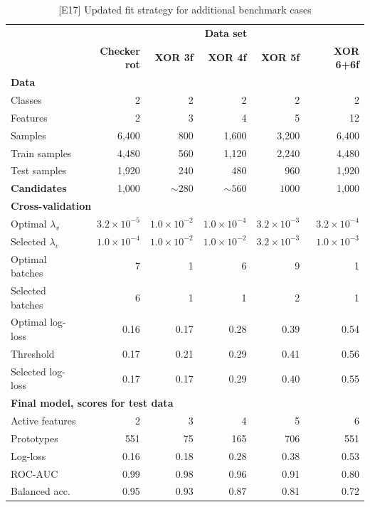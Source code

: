 \begin{table}
\caption{[E17] Updated fit strategy for additional benchmark cases}
\label{tab_e17}
%
\begin{center}
\small
\begin{tabular}{|lrrrrr|}
\hline
&\multicolumn{5}{c|}{\textbf{\hrulefill\ Data set \hrulefill}}\\
&\textbf{Checker rot}&\textbf{XOR 3f}&\textbf{XOR 4f}&\textbf{XOR 5f}&\textbf{XOR 6+6f}\\
\multicolumn{6}{|l|}{\textbf{Data}}\\
Classes&2&2&2&2&2\\
Features&2&3&4&5&12\\
Samples&6,400&800&1,600&3,200&6,400\\
Train samples&4,480&560&1,120&2,240&4,480\\
Test samples&1,920&240&480&960&1,920\\
\textbf{Candidates}&1,000&$\sim280$&$\sim560$&$1000$&1,000\\
\multicolumn{6}{|l|}{\textbf{Cross-validation}}\\
Optimal $\lambda_v$&$3.2\times10^{-5}$&$1.0\times10^{-2}$&$1.0\times10^{-4}$&$3.2\times10^{-3}$&$3.2\times10^{-4}$\\
Selected $\lambda_v$&$1.0\times10^{-4}$&$1.0\times10^{-2}$&$1.0\times10^{-2}$&$3.2\times10^{-3}$&$1.0\times10^{-3}$\\
Optimal batches&7&1&6&9&1\\
Selected batches&6&1&1&2&1\\
Optimal log-loss&0.16&0.17&0.28&0.39&0.54\\
Threshold&0.17&0.21&0.29&0.41&0.56\\
Selected log-loss&0.17&0.17&0.29&0.40&0.55\\
\multicolumn{6}{|l|}{\textbf{Final model, scores for test data}}\\
Active features&2&3&4&5&6\\
Prototypes&551&75&165&706&551\\
Log-loss&0.16&0.18&0.28&0.38&0.53\\
ROC-AUC&0.99&0.98&0.96&0.91&0.80\\
Balanced acc.&0.95&0.93&0.87&0.81&0.72\\
\hline
\end{tabular}
\end{center}
\end{table}
%
